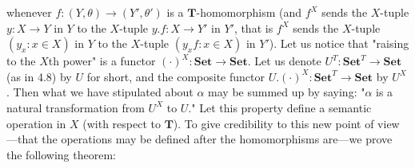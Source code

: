 whenever $f: (Y, \theta) \longrightarrow (Y', \theta')$ is a $\mathbf{T}$-homomorphism (and $f^X$ sends the $X$-tuple $y: X \longrightarrow Y$ in $Y$ to the $X$-tuple $y.f: X \longrightarrow Y'$ in $Y'$, that is $f^X$ sends the $X$-tuple $(y_x: x \in X)$ in $Y$ to the $X$-tuple $(y_x f: x \in X)$ in $Y'$). Let us notice that "raising to the $X$th power" is a functor $(\cdot)^X: \mathbf{Set} \longrightarrow \mathbf{Set}$. Let us denote $U^T: \mathbf{Set}^T \longrightarrow \mathbf{Set}$ (as in 4.8) by $U$ for short, and the composite functor $U.(\cdot)^X: \mathbf{Set}^T \longrightarrow \mathbf{Set}$ by $U^X$. Then what we have stipulated about $\alpha$ may be summed up by saying: "$\alpha$ is a natural transformation from $U^X$ to $U$." Let this property define a semantic operation in $X$ (with respect to $\mathbf{T}$). To give credibility to this new point of view—that the operations may be defined after the homomorphisms are—we prove the following theorem: